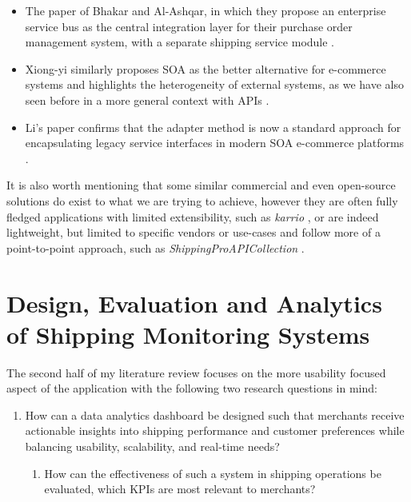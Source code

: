 \documentclass{imc-inf}
\begin{document}
\begin{itemize}[itemsep=3pt]
  \item The paper of Bhakar and Al-Ashqar, in which they propose an enterprise service bus as the central integration layer for their purchase order management system, with a separate shipping service module \cite{barakaBuildingSOABasedModel2013}.
  \item Xiong-yi similarly proposes SOA as the better alternative for e-commerce systems and highlights the heterogeneity of external systems, as we have also seen before in a more general context with APIs \cite{xiong-yiResearchApplicationSOA2009}.
  \item Li's paper confirms that the adapter method is now a standard approach for encapsulating legacy service interfaces in modern SOA e-commerce platforms \cite{liDesignB2BEcommerce2019}.
\end{itemize}

It is also worth mentioning that some similar commercial and even open-source solutions do exist to what we are trying to achieve, however they are often fully fledged applications with limited extensibility, such as \textit{karrio} \cite{KarrioapiKarrio2026}, or are indeed lightweight, but limited to specific vendors or use-cases and follow more of a point-to-point approach, such as \textit{ShippingProAPICollection} \cite{kevinvenclovasKevinvenclovasShippingProAPICollection2025}.

\section{Design, Evaluation and Analytics of Shipping Monitoring Systems}
The second half of my literature review focuses on the more usability focused aspect of the application with the following two research questions in mind:

\begin{enumerate}[resume, label=\textbf{MRQ2}, left=0pt, itemsep=3pt]
  \item How can a data analytics dashboard be designed such that merchants receive actionable insights into shipping performance and customer preferences while balancing usability, scalability, and real-time needs?
        \begin{enumerate}[label=\textbf{SRQ2.1}, left=1.8em, itemsep=3pt]
          \item How can the effectiveness of such a system in shipping operations be evaluated, which KPIs are most relevant to merchants?
        \end{enumerate}
\end{enumerate}
\end{document}
